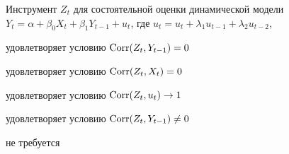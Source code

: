 
\begin{question}
Инструмент \(Z_t\) для состоятельной оценки динамической модели \(Y_{t} =\alpha +\beta_0 X_t + \beta_1 Y_{t-1} + u_t\),
где \(u_t = u_t + \lambda_1 u_{t-1} + \lambda_2 u_{t-2}\),
\begin{answerlist}
  \item удовлетворяет условию \(\operatorname{Corr}(Z_t, Y_{t-1}) =0\)
  \item удовлетворяет условию \(\operatorname{Corr}(Z_t, X_t) =0\)
  \item удовлетворяет условию \(\operatorname{Corr}(Z_t, u_t) \to 1\)
  \item удовлетворяет условию \(\operatorname{Corr}(Z_t, Y_{t-1}) \neq 0\)
  \item не требуется
\end{answerlist}
\end{question}


